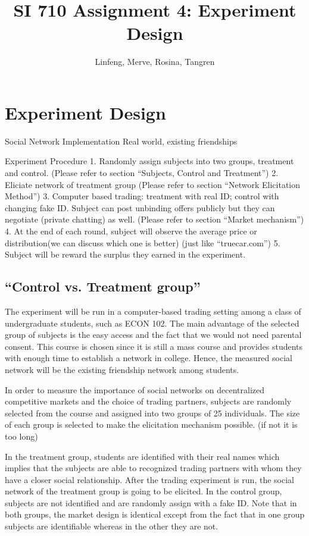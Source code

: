 \documentclass{article}
\title{SI 710 Assignment 4: Experiment Design}
\author{Linfeng, Merve, Rosina, Tangren}
\date{}
\begin{document}
\maketitle
%

\section{Experiment Design}
Social Network Implementation
Real world, existing friendships

Experiment Procedure
1. Randomly assign subjects into two groups, treatment and control. (Please refer to section “Subjects, Control and Treatment”)
2. Eliciate network of treatment group (Please refer to section “Network Elicitation Method”)
3. Computer based trading: treatment with real ID; control with changing fake ID. Subject can post unbinding offers publicly but they can negotiate (private chatting) as well. (Please refer to section “Market mechanism”)
4. At the end of each round, subject will observe the average price or distribution(we can discuss which one is better) (just like “truecar.com”)
5. Subject will be reward the surplus they earned in the experiment.

\subsection{``Control vs. Treatment group''}
The experiment will be run in a computer-based trading setting among a class of undergraduate students, such as ECON 102. The main advantage of the selected group of subjects is the easy access and the fact that we would not need parental consent. This course is chosen since it is still a mass course and provides students with enough time to establish a network in college. Hence, the measured social network will be the existing friendship network among students.

In order to measure the importance of social networks on decentralized competitive markets and the choice of trading partners, subjects are randomly selected from the course and assigned into two groups of 25 individuals. The size of each group is selected to make the elicitation mechanism possible. (if not it is too long)

In the treatment group, students are identified with their real names which implies that the subjects are able to recognized trading partners with whom they have a closer social relationship. After the trading experiment is run, the social network of the treatment group is going to be elicited. In the control group, subjects are not identified and are randomly assign with a fake ID. Note that in both groups, the market design is identical except from the fact that in one group subjects are identifiable whereas in the other they are not.
\end{document}
